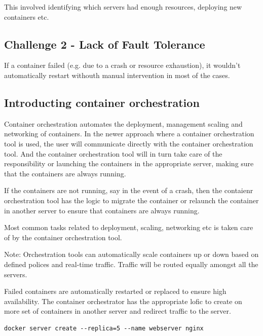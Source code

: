 \documentclass[11pt]{book}
\begin{document}
    This involved identifying which servers had enough resources, deploying new containers etc.

    \subsection{Challenge 2 - Lack of Fault Tolerance}
    If a container failed (e.g. due to a crash or resource exhaustion), it wouldn't automatically restart withouth manual intervention in most of the cases.

    \subsection{Introducting container orchestration}
    Container orchestration automates the deployment, management scaling and networking of containers.
    In the newer approach where a container orchestration tool is used, the user will communicate directly with the container orchestration tool.
    And the container orchestration tool will in turn take care of the responsibility or launching the containers in the appropriate server, making sure that the containers are always running.

    If the containers are not running, say in the event of a crash, then the contaienr orchestration tool has the logic to migrate the container or relaunch the container in another server to ensure that containers are always running.

    Most common tasks related to deployment, scaling, networking etc is taken care of by the container orchestration tool.

    Note:
    Orchestration tools can automatically scale containers up or down based on defined polices and real-time traffic.
    Traffic will be routed equally amongst all the servers.

    Failed containers are automatically restarted or replaced to ensure high availability.
    The container orchestrator has the appropriate lofic to create on more set of containers in another server and redirect traffic to the server.

    \begin{lstlisting}[style=terminal]
        docker server create --replica=5 --name webserver nginx
    \end{lstlisting}
\end{document}
